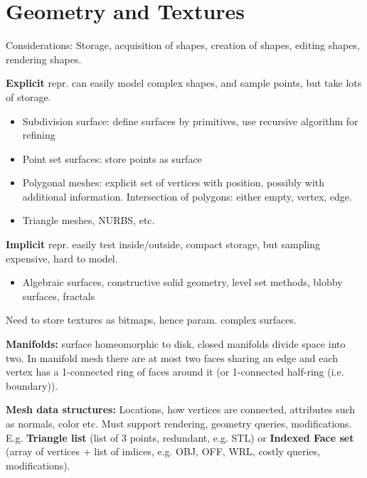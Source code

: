 \documentclass[a4paper,9pt]{article}
\begin{document}
\section{Geometry and Textures}
Considerations: Storage, acquisition of shapes, creation of shapes, editing shapes, rendering shapes.

\textbf{Explicit} repr. can easily model complex shapes, and sample points, but take lots of storage.
\begin{itemize}
  \item Subdivision surface: define surfaces by primitives, use recursive algorithm for refining
  \item Point set surfaces: store points as surface
  \item Polygonal meshes: explicit set of vertices with position, possibly with additional information. Intersection of polygons: either empty, vertex, edge.
  \item Triangle meshes, NURBS, etc.
\end{itemize}
\textbf{Implicit} repr. easily test inside/outside, compact storage, but sampling expensive, hard to model.
\begin{itemize}
  \item Algebraic surfaces, constructive solid geometry, level set methods, blobby surfaces, fractals
\end{itemize}
Need to store textures as bitmaps, hence param. complex surfaces.

\textbf{Manifolds:} surface homeomorphic to disk, closed manifolds divide space into two. In manifold mesh there are at most two faces sharing an edge and each vertex has a 1-connected ring of faces around it (or 1-connected half-ring (i.e. boundary)).

\textbf{Mesh data structures:} Locations, how vertices are connected, attributes such as normals, color etc. Must support rendering, geometry queries, modifications. E.g. \textbf{Triangle list} (list of 3 points, redundant, e.g. STL) or \textbf{Indexed Face set} (array of vertices + list of indices, e.g. OBJ, OFF, WRL, costly queries, modifications).
\end{document}
